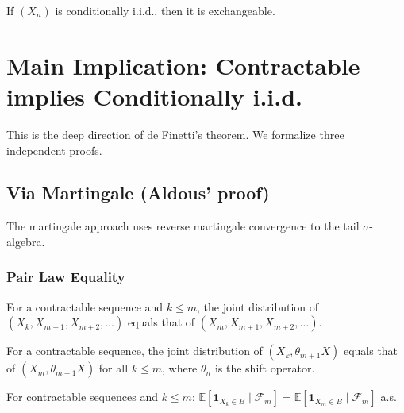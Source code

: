 \begin{theorem}
  \label{thm:exchangeable_of_conditionallyIID}
  \leanok
  If $(X_n)$ is conditionally i.i.d., then it is exchangeable.
\end{theorem}


\chapter{Main Implication: Contractable implies Conditionally i.i.d.}

This is the deep direction of de Finetti's theorem. We formalize three independent proofs.

\section{Via Martingale (Aldous' proof)}

The martingale approach uses reverse martingale convergence to the tail $\sigma$-algebra.

\subsection{Pair Law Equality}

\begin{lemma}
  \label{lem:pair_law_eq}
  \leanok
  For a contractable sequence and $k \le m$, the joint distribution of
  $(X_k, X_{m+1}, X_{m+2}, \ldots)$ equals that of $(X_m, X_{m+1}, X_{m+2}, \ldots)$.
\end{lemma}

\begin{lemma}
  \label{lem:contractable_dist_eq}
  \leanok
  For a contractable sequence, the joint distribution of $(X_k, \theta_{m+1} X)$ equals
  that of $(X_m, \theta_{m+1} X)$ for all $k \le m$, where $\theta_n$ is the shift operator.
\end{lemma}

\begin{lemma}
  \label{lem:condExp_indicator_eq}
  \leanok
  For contractable sequences and $k \le m$:
  $\mathbb{E}[\mathbf{1}_{X_k \in B} \mid \mathcal{F}_m] = \mathbb{E}[\mathbf{1}_{X_m \in B} \mid \mathcal{F}_m]$ a.s.
\end{lemma}

